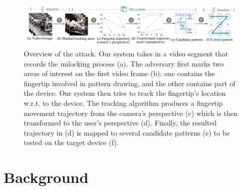 \begin{figure}[!ht]
    \centering
    \includegraphics[width=\textwidth]{fig/overview.pdf}
    \vspace{-4mm}
    \caption{Overview of the attack.
     Our system takes in a video segment that records the unlocking process (a). The adversary first marks two areas of interest on the first video frame (b): one contains the fingertip involved in pattern drawing, and the other contains part of the device. Our system then tries to track the fingertip's location w.r.t. to the device.
     The tracking algorithm produces a fingertip movement trajectory from the camera's perspective (c) which is then transformed to the user's perspective (d). Finally, the resulted trajectory in (d) is mapped to several candidate patterns (e) to be tested on the target device (f). }
    \label{fig:fig2}
    \vspace{-5mm}
\end{figure}

\section{Background}
